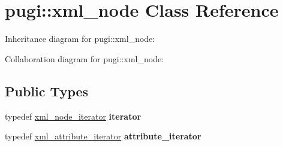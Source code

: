 \hypertarget{classpugi_1_1xml__node}{}\section{pugi\+:\+:xml\+\_\+node Class Reference}
\label{classpugi_1_1xml__node}


Inheritance diagram for pugi\+:\+:xml\+\_\+node\+:


Collaboration diagram for pugi\+:\+:xml\+\_\+node\+:
\subsection*{Public Types}
\begin{DoxyCompactItemize}
\item 
\hypertarget{classpugi_1_1xml__node_ae053ea39add5a64de584f7a81212e388}{}typedef \hyperlink{classpugi_1_1xml__node__iterator}{xml\+\_\+node\+\_\+iterator} {\bfseries iterator}\label{classpugi_1_1xml__node_ae053ea39add5a64de584f7a81212e388}

\item 
\hypertarget{classpugi_1_1xml__node_a9084f97350ffc64af1eaf7c17c57f4ba}{}typedef \hyperlink{classpugi_1_1xml__attribute__iterator}{xml\+\_\+attribute\+\_\+iterator} {\bfseries attribute\+\_\+iterator}\label{classpugi_1_1xml__node_a9084f97350ffc64af1eaf7c17c57f4ba}

\end{DoxyCompactItemize}
